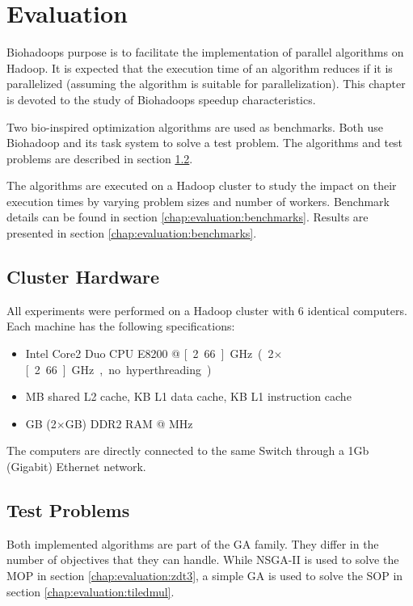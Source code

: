 \chapter{Evaluation}
\label{chap:evaluation}
Biohadoops purpose is to facilitate the implementation of parallel algorithms on Hadoop. It is expected that the execution time of an algorithm reduces if it is parallelized (assuming the algorithm is suitable for parallelization). This chapter is devoted to the study of Biohadoops speedup characteristics.

Two bio-inspired optimization algorithms are used as benchmarks. Both use Biohadoop and its task system to solve a test problem. The algorithms and test problems are described in section \ref{chap:evaluation:testproblems}.

The algorithms are executed on a Hadoop cluster to study the impact on their execution times by varying problem sizes and number of workers. Benchmark details can be found in section \ref{chap:evaluation:benchmarks}. Results are presented in section \ref{chap:evaluation:benchmarks}.

\section{Cluster Hardware}
\label{chap:evaluation:cluster}
All experiments were performed on a Hadoop cluster with 6 identical computers. Each machine has the following specifications:

\begin{itemize}
  \item Intel Core2 Duo CPU E8200 @ \unit[2.66]{GHz} (2$\times$\unit[2.66]{GHz}, no hyperthreading)
  \item \unit[6]{MB} shared L2 cache, \unit[32]{KB} L1 data cache, \unit[32]{KB} L1 instruction cache
  \item \unit[4]{GB} (2$\times$\unit[2]{GB}) DDR2 RAM @ \unit[667]{MHz}
\end{itemize}

The computers are directly connected to the same Switch through a 1Gb (Gigabit) Ethernet network.

\section{Test Problems}
\label{chap:evaluation:testproblems}
Both implemented algorithms are part of the GA family. They differ in the number of objectives that they can handle. While NSGA-II is used to solve the MOP in section \ref{chap:evaluation:zdt3}, a simple GA is used to solve the SOP in section \ref{chap:evaluation:tiledmul}.

